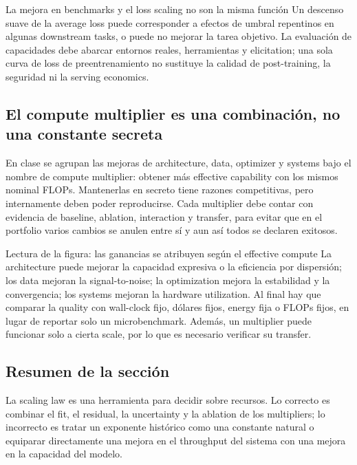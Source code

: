 \begin{warningbox}{La mejora en benchmarks y el loss scaling no son la misma función}
Un descenso suave de la average loss puede corresponder a efectos de umbral repentinos en algunas downstream tasks, o puede no mejorar la tarea objetivo. La evaluación de capacidades debe abarcar entornos reales, herramientas y elicitation; una sola curva de loss de preentrenamiento no sustituye la calidad de post-training, la seguridad ni la serving economics.
\end{warningbox}

\subsection{El compute multiplier es una combinación, no una constante secreta}

En clase se agrupan las mejoras de architecture, data, optimizer y systems bajo el nombre de compute multiplier: obtener más effective capability con los mismos nominal FLOPs. Mantenerlas en secreto tiene razones competitivas, pero internamente deben poder reproducirse. Cada multiplier debe contar con evidencia de baseline, ablation, interaction y transfer, para evitar que en el portfolio varios cambios se anulen entre sí y aun así todos se declaren exitosos.


\begin{knowledgebox}{Lectura de la figura: las ganancias se atribuyen según el effective compute}
La architecture puede mejorar la capacidad expresiva o la eficiencia por dispersión; los data mejoran la signal-to-noise; la optimization mejora la estabilidad y la convergencia; los systems mejoran la hardware utilization. Al final hay que comparar la quality con wall-clock fijo, dólares fijos, energy fija o FLOPs fijos, en lugar de reportar solo un microbenchmark. Además, un multiplier puede funcionar solo a cierta scale, por lo que es necesario verificar su transfer.
\end{knowledgebox}


\subsection{Resumen de la sección}

La scaling law es una herramienta para decidir sobre recursos. Lo correcto es combinar el fit, el residual, la uncertainty y la ablation de los multipliers; lo incorrecto es tratar un exponente histórico como una constante natural o equiparar directamente una mejora en el throughput del sistema con una mejora en la capacidad del modelo.
